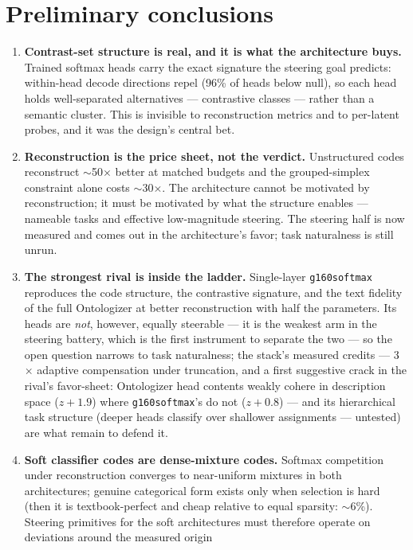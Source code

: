 \documentclass[11pt]{article}
\begin{document}
\section{Preliminary conclusions}

\begin{enumerate}
\item \textbf{Contrast-set structure is real, and it is what the
architecture buys.} Trained softmax heads carry the exact signature the
steering goal predicts: within-head decode directions repel (96\% of
heads below null), so each head holds well-separated alternatives ---
contrastive classes --- rather than a semantic cluster. This is invisible
to reconstruction metrics and to per-latent probes, and it was the
design's central bet.
\item \textbf{Reconstruction is the price sheet, not the verdict.}
Unstructured codes reconstruct $\sim$50$\times$ better at matched budgets
and the grouped-simplex constraint alone costs $\sim$30$\times$. The
architecture cannot be motivated by reconstruction; it must be motivated
by what the structure enables --- nameable tasks and effective
low-magnitude steering. The steering half is now measured and comes out
in the architecture's favor; task naturalness is still unrun.
\item \textbf{The strongest rival is inside the ladder.} Single-layer
\texttt{g160softmax} reproduces the code structure, the contrastive
signature, and the text fidelity of the full Ontologizer at better
reconstruction with half the parameters. Its heads are \emph{not},
however, equally steerable --- it is the weakest arm in the steering
battery, which is the first instrument to separate the two --- so the
open question narrows to task naturalness; the stack's measured credits
---
3$\times$ adaptive compensation under truncation, and a first
suggestive crack in the rival's favor-sheet: Ontologizer head contents
weakly cohere in description space ($z{+}1.9$) where
\texttt{g160softmax}'s do not ($z{+}0.8$) --- and its hierarchical
task structure (deeper heads classify over shallower assignments ---
untested) are what remain to defend it.
\item \textbf{Soft classifier codes are dense-mixture codes.} Softmax
competition under reconstruction converges to near-uniform mixtures in
both architectures; genuine categorical form exists only when selection
is hard (then it is textbook-perfect and cheap relative to equal
sparsity: $\sim$6\%). Steering primitives for the soft architectures must
therefore operate on deviations around the measured origin

\end{enumerate}
\end{document}
